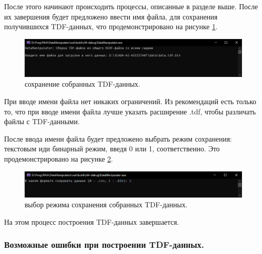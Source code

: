 {  \par После этого начинают происходить процессы, описанные в разделе выше. После их завершения будет предложено ввести имя файла, для сохранения получившихся TDF-данных, что продемонстрировано на рисунке \ref{fig:CreateTDFSR}.

  \begin{figure}[H]
    \centering
    \includegraphics[width=\textwidth]{images/forDataManipulator/CreateTDFSafeResult.png}
    \caption{сохранение собранных TDF-данных.} 
    \label{fig:CreateTDFSR}
  \end{figure}

  \par При вводе имени файла нет никаких ограничений. Из рекомендаций есть только то, что при вводе имени файла лучше указать расширение .tdf, чтобы различать файлы с TDF-данными.
  
  \par После ввода имени файла будет предложено выбрать режим сохранения: текстовым иди бинарный режим, введя 0 или 1, соответственно. Это продемонстрировано на рисунке \ref{fig:CreateTDFTS}. 

  \begin{figure}[H]
    \centering
    \includegraphics[width=\textwidth]{images/forDataManipulator/CreateTDFTypeSafe.png}
    \caption{выбор режима сохранения собранных TDF-данных.} 
    \label{fig:CreateTDFTS}
  \end{figure}

  \par На этом процесс построения TDF-данных завершается.

  \par 

}

\subsubsection{ \standartTitleFont
  Возможные ошибки при построении TDF-данных.
} \label{subsubsec:CreateTDFErr}

